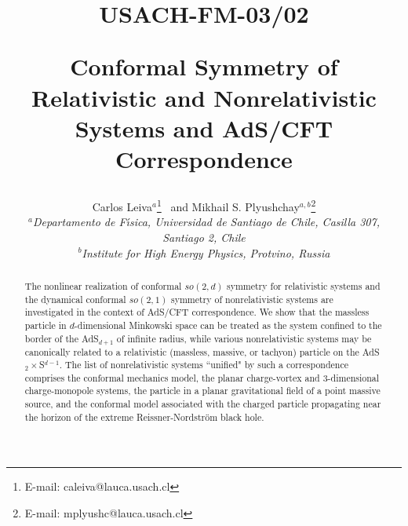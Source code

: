 \documentclass[a4paper,12pt]{article}
\begin{document}
\title{
\begin{flushright}
{\small USACH-FM-03/02}\\[1.0cm]
\end{flushright}
{\bf Conformal Symmetry of
Relativistic and Nonrelativistic
Systems and AdS/CFT Correspondence}}

\author{{\sf Carlos Leiva${}^{a}$}\thanks{
E-mail: caleiva@lauca.usach.cl}
{\sf\ and Mikhail S. Plyushchay${}^{a,b}$}\thanks{
E-mail: mplyushc@lauca.usach.cl}
\\
{\small {\it ${}^a$Departamento de F\'{\i}sica,
Universidad de Santiago de Chile,
Casilla 307, Santiago 2, Chile}}\\
{\small {\it ${}^b$Institute for High Energy Physics,
Protvino, Russia}}}
\date{}












\maketitle


\begin{abstract}
The nonlinear realization
of conformal $so(2,d)$ symmetry for relativistic
systems  and  the dynamical  conformal $so(2,1)$ symmetry
of nonrelativistic  systems
are investigated  in the context of AdS/CFT correspondence.
We show that the massless particle
in $d$-dimensional Minkowski space can be treated
as the system confined to the border
of the AdS${}_{d+1}$ of infinite radius,
while various nonrelativistic systems
may be canonically related
to a relativistic
(massless, massive, or tachyon) particle
on the AdS${}_{2}\times$S${}^{d-1}$.
The list of nonrelativistic systems ``unified"
by such a correspondence comprises
the conformal mechanics model,
the planar charge-vortex and
$3$-dimensional
charge-monopole systems,
the particle in a planar
gravitational field of a point massive source,
and the conformal model associated with the charged
particle propagating near the horizon of the
extreme Reissner-Nordstr\"om
black hole.
\end{abstract}
\end{document}
